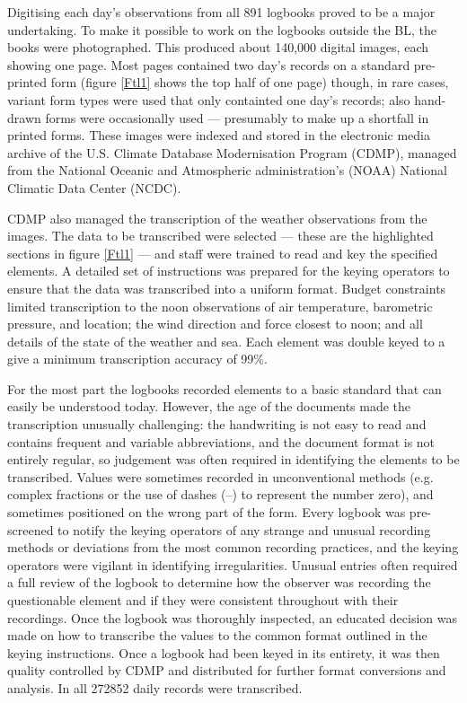 \documentclass[CP]{copernicus}
\begin{document}
Digitising each day's observations from all 891 logbooks proved to be a major undertaking. To make it possible to work on the logbooks outside the BL, the books were photographed. This produced about 140,000 digital images, each showing one page. Most pages contained two day's records on a standard pre-printed form (figure \ref{Ftl1} shows the top half of one page) though, in rare cases, variant form types were used that only containted one day's records; also hand-drawn forms were occasionally used --- presumably to make up a shortfall in printed forms. These images were indexed and stored in the electronic media archive of the U.S. Climate Database Modernisation Program (CDMP), managed from the National Oceanic and Atmospheric administration's (NOAA) National Climatic Data Center (NCDC).

CDMP also managed the transcription of the weather observations from the images. The data to be transcribed were selected --- these are the highlighted sections in figure \ref{Ftl1} --- and staff were trained to read and key the specified elements. A detailed set of instructions was prepared for the keying operators to ensure that the data was transcribed into a uniform format. Budget constraints limited transcription to the noon observations of air temperature, barometric pressure, and location; the wind direction and force closest to noon; and all details of the state of the weather and sea. Each element was double keyed to a give a minimum transcription accuracy of 99\%.

For the most part the logbooks recorded elements to a basic standard that can easily be understood today. However, the age of the documents made the transcription unusually challenging: the handwriting is not easy to read and contains frequent and variable abbreviations, and the document format is not entirely regular, so judgement was often required in identifying the elements to be transcribed. Values were sometimes recorded in unconventional methods (e.g. complex fractions or the use of dashes (--) to represent the number zero), and sometimes positioned on the wrong part of the form. Every logbook was pre-screened to notify the keying operators of any strange and unusual recording methods or deviations from the most common recording practices, and the keying operators were vigilant in identifying irregularities. Unusual entries often required a full review of the logbook to determine how the observer was recording the questionable element and if they were consistent throughout with their recordings. Once the logbook was thoroughly inspected, an educated decision was made on how to transcribe the values to the common format outlined in the keying instructions. Once a logbook had been keyed in its entirety, it was then quality controlled by CDMP and distributed for further format conversions and analysis. In all 272852 daily records were transcribed. 
\end{document}
